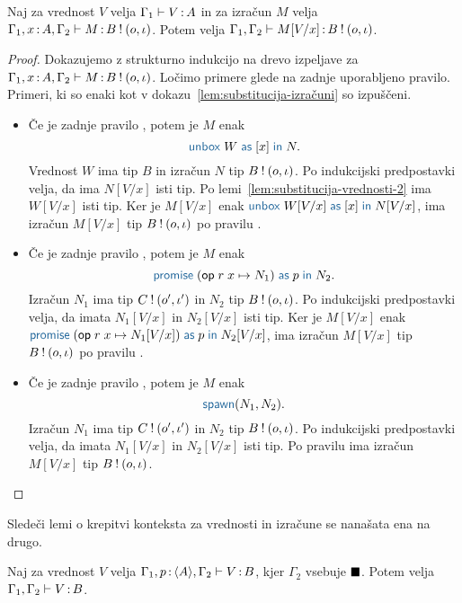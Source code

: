 \begin{lema}\label{lem:substitucija-izračuni-2}
	Naj za vrednost $V$ velja $\Gamma_1 \vdash V \mathinner{:} A$ in za izračun $M$ velja $\Gamma_1, x \mathinner{:} A, \Gamma_2 \vdash M \mathinner{:} B \mathbin{!} (o, \iota)$. Potem velja $\Gamma_1, \Gamma_2 \vdash M[V/x] \mathinner{:} B \mathbin{!} (o, \iota)$.
\end{lema}

\begin{proof}
	Dokazujemo z strukturno indukcijo na drevo izpeljave za $\Gamma_1, x \mathinner{:} A, \Gamma_2 \vdash M \mathinner{:} B \mathbin{!} (o, \iota)$.
	Ločimo primere glede na zadnje uporabljeno pravilo.
	Primeri, ki so enaki kot v dokazu~\ref{lem:substitucija-izračuni} so izpuščeni.
	
	\begin{itemize}
		\item Če je zadnje pravilo , potem je $M$ enak $$\tmunbox{W}{x}{N}.$$ Vrednost $W$ ima tip $B$ in izračun $N$ tip $B \mathbin{!} (o, \iota)$.
		Po indukcijski predpostavki velja, da ima $N[V/x]$ isti tip. Po lemi~\ref{lem:substitucija-vrednosti-2} ima $W[V/x]$ isti tip. Ker je $M[V/x]$ enak $\tmunbox{W[V/x]}{x}{N[V/x]}$, ima izračun $M[V/x]$ tip $B \mathbin{!} (o, \iota)$ po pravilu .
		
		\item Če je zadnje pravilo , potem je $M$ enak $$\tmwithrec{op}{r}{x}{N_1}{p}{N_2}.$$ Izračun $N_1$ ima tip $C \mathbin{!} (o', \iota')$ in $N_2$ tip $B \mathbin{!} (o, \iota)$.
		Po indukcijski predpostavki velja, da imata $N_1[V/x]$ in $N_2[V/x]$ isti tip. Ker je $M[V/x]$ enak $\tmwithrec{op}{r}{x}{N_1[V/x]}{p}{N_2[V/x]}$, ima izračun $M[V/x]$ tip $B \mathbin{!} (o, \iota)$ po pravilu .
		
		\item Če je zadnje pravilo , potem je $M$ enak $$\tmspawn{N_1}{N_2}.$$ Izračun $N_1$ ima tip $C \mathbin{!} (o', \iota')$ in $N_2$ tip $B \mathbin{!} (o, \iota)$.
		Po indukcijski predpostavki velja, da imata $N_1[V/x]$ in $N_2[V/x]$ isti tip. Po pravilu  ima izračun $M[V/x]$ tip $B \mathbin{!} (o, \iota)$.	
	\end{itemize}
	
\end{proof}

Sledeči lemi o krepitvi konteksta za vrednosti in izračune se nanašata ena na drugo.

\begin{lema}\label{lem:strengthening-values-promise}
	Naj za vrednost $V$ velja $\Gamma_1, p \mathinner{:} \langle A \rangle, \Gamma_2 \vdash V \mathinner{:} B$, kjer $\Gamma_2$ vsebuje $\blacksquare$. Potem velja $\Gamma_1, \Gamma_2 \vdash V \mathinner{:} B$.
\end{lema}

